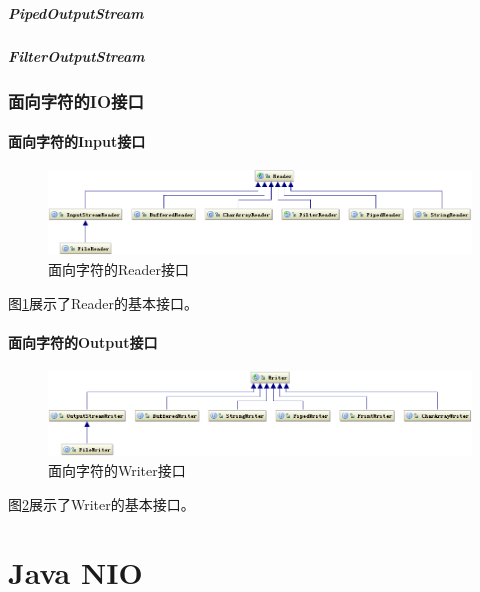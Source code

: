 \documentclass[a4paper,11pt]{article}
\begin{document}
\subsubsection[PipedOutputStream]{PipedOutputStream}
\subsubsection[FilterOutputStream]{FilterOutputStream}


\section[面向字符的IO接口]{面向字符的IO接口}
\subsection[面向字符的Input接口]{面向字符的Input接口}
\begin{figure}
  \centering
  \includegraphics[width=.9\textwidth]{picturedir/reader.png}
  \caption{面向字符的Reader接口}
  \label{fig:reader}
\end{figure}

图\ref{fig:reader}展示了Reader的基本接口。

\subsection[面向字符的Output接口]{面向字符的Output接口}
\begin{figure}
  \centering
  \includegraphics[width=.9\textwidth]{picturedir/writer.png}
  \caption{面向字符的Writer接口}
  \label{fig:writer}
\end{figure}

图\ref{fig:writer}展示了Writer的基本接口。



\part[Java NIO]{Java NIO}
\end{document}
